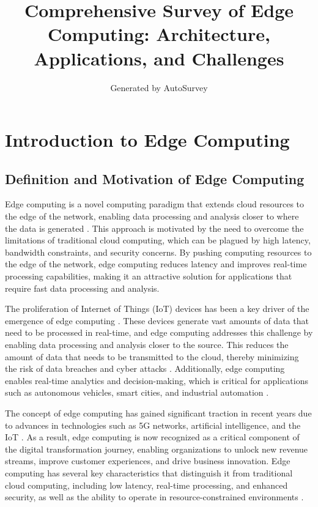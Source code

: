 \documentclass[11pt]{article}
\title{Comprehensive Survey of Edge Computing: Architecture, Applications, and Challenges}
\author{Generated by AutoSurvey}
\date{}
\begin{document}
\maketitle
\tableofcontents
\newpage

\section{Introduction to Edge Computing}

\subsection{Definition and Motivation of Edge Computing}

Edge computing is a novel computing paradigm that extends cloud resources to the edge of the network, enabling data processing and analysis closer to where the data is generated \cite{ref1}. This approach is motivated by the need to overcome the limitations of traditional cloud computing, which can be plagued by high latency, bandwidth constraints, and security concerns. By pushing computing resources to the edge of the network, edge computing reduces latency and improves real-time processing capabilities, making it an attractive solution for applications that require fast data processing and analysis.

The proliferation of Internet of Things (IoT) devices has been a key driver of the emergence of edge computing \cite{ref2}. These devices generate vast amounts of data that need to be processed in real-time, and edge computing addresses this challenge by enabling data processing and analysis closer to the source. This reduces the amount of data that needs to be transmitted to the cloud, thereby minimizing the risk of data breaches and cyber attacks \cite{ref3}. Additionally, edge computing enables real-time analytics and decision-making, which is critical for applications such as autonomous vehicles, smart cities, and industrial automation \cite{ref4}.

The concept of edge computing has gained significant traction in recent years due to advances in technologies such as 5G networks, artificial intelligence, and the IoT \cite{ref5}. As a result, edge computing is now recognized as a critical component of the digital transformation journey, enabling organizations to unlock new revenue streams, improve customer experiences, and drive business innovation. Edge computing has several key characteristics that distinguish it from traditional cloud computing, including low latency, real-time processing, and enhanced security, as well as the ability to operate in resource-constrained environments \cite{ref6}.
\end{document}
